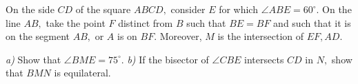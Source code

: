 On the side $ CD $ of the square $ ABCD, $ consider $ E $ for which $ \angle ABE =60^{\circ } . $ On the line $ AB, $ take the point $ F $ distinct from $ B $ such that $ BE=BF $ and such that it is on the segment $ AB, $ or $ A $ is on $ BF. $ Moreover, $ M $ is the intersection of $ EF,AD. $

\textit{a)} Show that $ \angle BME =75^{\circ } . $
\textit{b)} If the bisector of $ \angle CBE $ intersects $ CD $ in $ N, $ show that $ BMN $ is equilateral.